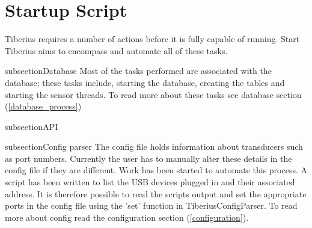 \section{Startup Script}
\label{sec:misc_startup_script} %

Tiberius requires a number of actions before it is fully capable of running. Start Tiberius aims to encompass and automate all of these tasks. 

subsection{Database}
Most of the tasks performed are associated with the database; these tasks include, starting the database, creating the tables and starting the sensor threads. To read more about these tasks see database section (\ref{database_process})

subsection{API}

subsection{Config parser}
The config file holds information about transducers such as port numbers. Currently the user has to manually alter these details in the config file if they are different. Work has been started to automate this process. A script has been written to list the USB devices plugged in and their associated address. It is therefore possible to read the scripts output and set the appropriate ports in the config file using the 'set' function in TiberiusConfigParser. To read more about config read the configuration section (\ref{configuration}).

